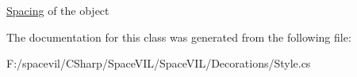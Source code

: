 \mbox{\hyperlink{struct_space_v_i_l_1_1_decorations_1_1_spacing}{Spacing}} of the object 



The documentation for this class was generated from the following file\+:\begin{DoxyCompactItemize}
\item 
F\+:/spacevil/\+C\+Sharp/\+Space\+V\+I\+L/\+Space\+V\+I\+L/\+Decorations/Style.\+cs\end{DoxyCompactItemize}
